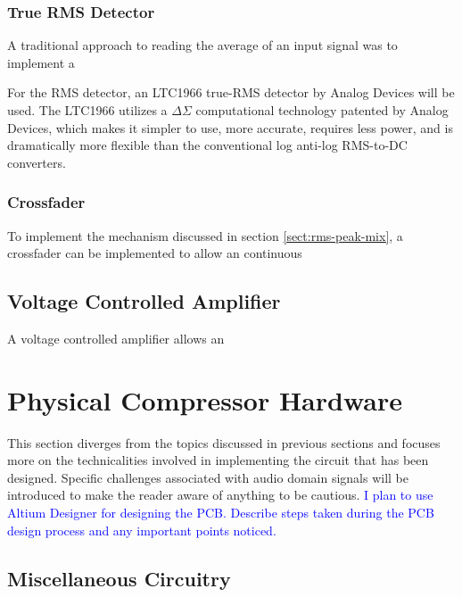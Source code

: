 \documentclass[10pt]{article}
\begin{document}
\begin{multicols*}{2}
                \subsubsection{True RMS Detector}
                    A traditional approach to reading the average of an input signal was to implement a 
                    
                    For the RMS detector, an LTC1966 true-RMS detector by Analog Devices will be used. The LTC1966 utilizes a $\Delta\Sigma$ computational technology patented by Analog Devices, which makes it simpler to use, more accurate, requires less power, and is dramatically more flexible than the conventional log anti-log RMS-to-DC converters.                 
                    
                \subsubsection{Crossfader}
                    To implement the mechanism discussed in section \ref{sect:rms-peak-mix}, a crossfader can be implemented to allow an continuous 

            \subsection{Voltage Controlled Amplifier}
                A voltage controlled amplifier allows an 
                

        \section{Physical Compressor Hardware}
            This section diverges from the topics discussed in previous sections and focuses more on the technicalities involved in implementing the circuit that has been designed. Specific challenges associated with audio domain signals will be introduced to make the reader aware of anything to be cautious.
            \textcolor{blue}{I plan to use Altium Designer for designing the PCB. Describe steps taken during the PCB design process and any important points noticed.}

            \subsection{Miscellaneous Circuitry}


\end{multicols*}
\end{document}
